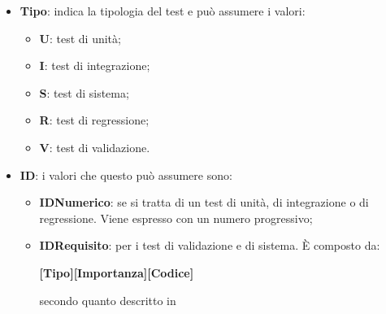 \begin{itemize}
    \item \textbf{Tipo}: indica la tipologia del test e può assumere i valori:
    \begin{itemize}
        \item \textbf{U}: test di unità;
        \item \textbf{I}: test di integrazione;
        \item \textbf{S}: test di sistema;
        \item \textbf{R}: test di regressione;
        \item \textbf{V}: test di validazione.
    \end{itemize}
    \item \textbf{ID}: i valori che questo può assumere sono:
    \begin{itemize}
        \item \textbf{IDNumerico}: se si tratta di un test di unità, di integrazione o di regressione. Viene espresso con un numero progressivo;
        \item \textbf{IDRequisito}: per i test di validazione e di sistema. È composto da:
        \begin{center}
            \textbf{[Tipo][Importanza][Codice]} 
        \end{center}
        secondo quanto descritto in %
    \end{itemize}
\end{itemize}
